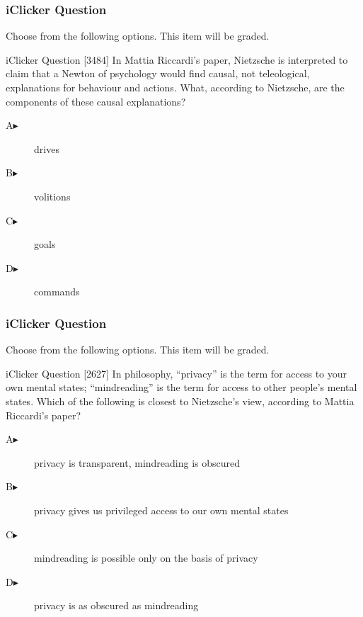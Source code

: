 \documentclass[xcolor=dvipsnames]{beamer}
\begin{document}
\begin{frame}
  \frametitle{iClicker Question}
Choose from the following options. This item will be graded.
\begin{block}{iClicker Question}
[3484] In Mattia Riccardi's paper, Nietzsche is interpreted to claim
that a Newton of psychology would find causal, not teleological,
explanations for behaviour and actions. What, according to Nietzsche,
are the components of these causal explanations?
\end{block}
\begin{description}
\item[A\hspace{.2in}$\blacktriangleright$] drives
\item[B\hspace{.2in}$\blacktriangleright$] volitions
\item[C\hspace{.2in}$\blacktriangleright$] goals
\item[D\hspace{.2in}$\blacktriangleright$] commands
\end{description}
\end{frame}

\begin{frame}
  \frametitle{iClicker Question}
Choose from the following options. This item will be graded.
\begin{block}{iClicker Question}
[2627] In philosophy, ``privacy'' is the term for access to your own
mental states; ``mindreading'' is the term for access to other
people's mental states. Which of the following is closest to
Nietzsche's view, according to Mattia Riccardi's paper?
\end{block}
\begin{description}
\item[A\hspace{.2in}$\blacktriangleright$] privacy is transparent, mindreading is obscured
\item[B\hspace{.2in}$\blacktriangleright$] privacy gives us privileged access to our own mental states
\item[C\hspace{.2in}$\blacktriangleright$] mindreading is possible only on the basis of privacy
\item[D\hspace{.2in}$\blacktriangleright$] privacy is as obscured as mindreading
\end{description}
\end{frame}
\end{document}
